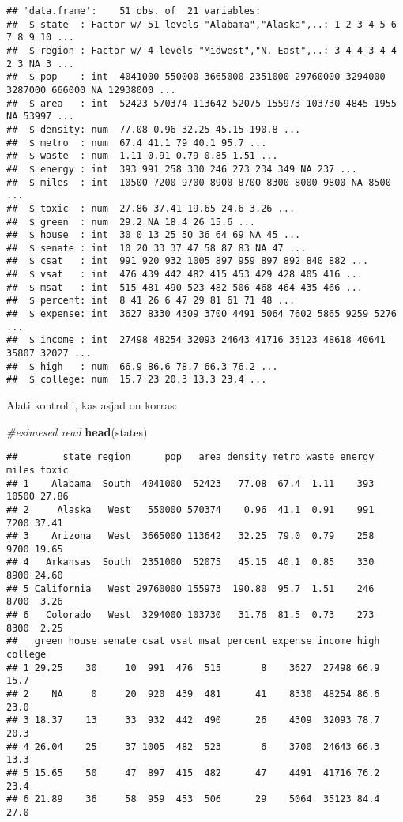 \documentclass[]{article}
\newenvironment{Shaded}{\begin{snugshade}}{\end{snugshade}}
\newcommand{\KeywordTok}[1]{\textcolor[rgb]{0.13,0.29,0.53}{\textbf{#1}}}
\newcommand{\CommentTok}[1]{\textcolor[rgb]{0.56,0.35,0.01}{\textit{#1}}}
\newcommand{\NormalTok}[1]{#1}
\begin{document}
\begin{verbatim}
## 'data.frame':    51 obs. of  21 variables:
##  $ state  : Factor w/ 51 levels "Alabama","Alaska",..: 1 2 3 4 5 6 7 8 9 10 ...
##  $ region : Factor w/ 4 levels "Midwest","N. East",..: 3 4 4 3 4 4 2 3 NA 3 ...
##  $ pop    : int  4041000 550000 3665000 2351000 29760000 3294000 3287000 666000 NA 12938000 ...
##  $ area   : int  52423 570374 113642 52075 155973 103730 4845 1955 NA 53997 ...
##  $ density: num  77.08 0.96 32.25 45.15 190.8 ...
##  $ metro  : num  67.4 41.1 79 40.1 95.7 ...
##  $ waste  : num  1.11 0.91 0.79 0.85 1.51 ...
##  $ energy : int  393 991 258 330 246 273 234 349 NA 237 ...
##  $ miles  : int  10500 7200 9700 8900 8700 8300 8000 9800 NA 8500 ...
##  $ toxic  : num  27.86 37.41 19.65 24.6 3.26 ...
##  $ green  : num  29.2 NA 18.4 26 15.6 ...
##  $ house  : int  30 0 13 25 50 36 64 69 NA 45 ...
##  $ senate : int  10 20 33 37 47 58 87 83 NA 47 ...
##  $ csat   : int  991 920 932 1005 897 959 897 892 840 882 ...
##  $ vsat   : int  476 439 442 482 415 453 429 428 405 416 ...
##  $ msat   : int  515 481 490 523 482 506 468 464 435 466 ...
##  $ percent: int  8 41 26 6 47 29 81 61 71 48 ...
##  $ expense: int  3627 8330 4309 3700 4491 5064 7602 5865 9259 5276 ...
##  $ income : int  27498 48254 32093 24643 41716 35123 48618 40641 35807 32027 ...
##  $ high   : num  66.9 86.6 78.7 66.3 76.2 ...
##  $ college: num  15.7 23 20.3 13.3 23.4 ...
\end{verbatim}

Alati kontrolli, kas asjad on korras:

\begin{Shaded}
\begin{Highlighting}[]
\CommentTok{#esimesed read}
\KeywordTok{head}\NormalTok{(states)}
\end{Highlighting}
\end{Shaded}

\begin{verbatim}
##        state region      pop   area density metro waste energy miles toxic
## 1    Alabama  South  4041000  52423   77.08  67.4  1.11    393 10500 27.86
## 2     Alaska   West   550000 570374    0.96  41.1  0.91    991  7200 37.41
## 3    Arizona   West  3665000 113642   32.25  79.0  0.79    258  9700 19.65
## 4   Arkansas  South  2351000  52075   45.15  40.1  0.85    330  8900 24.60
## 5 California   West 29760000 155973  190.80  95.7  1.51    246  8700  3.26
## 6   Colorado   West  3294000 103730   31.76  81.5  0.73    273  8300  2.25
##   green house senate csat vsat msat percent expense income high college
## 1 29.25    30     10  991  476  515       8    3627  27498 66.9    15.7
## 2    NA     0     20  920  439  481      41    8330  48254 86.6    23.0
## 3 18.37    13     33  932  442  490      26    4309  32093 78.7    20.3
## 4 26.04    25     37 1005  482  523       6    3700  24643 66.3    13.3
## 5 15.65    50     47  897  415  482      47    4491  41716 76.2    23.4
## 6 21.89    36     58  959  453  506      29    5064  35123 84.4    27.0
\end{verbatim}
\end{document}

